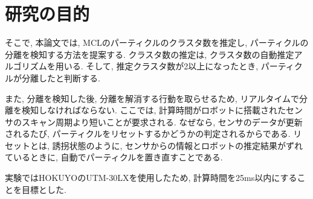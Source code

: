 \chapter{研究の目的}\label{chap:purpose}

そこで, 本論文では, MCLのパーティクルのクラスタ数を推定し, パーティクルの分離を検知する方法を提案する. 
クラスタ数の推定は, クラスタ数の自動推定アルゴリズムを用いる.
そして, 推定クラスタ数が2以上になったとき, パーティクルが分離したと判断する.

また, 分離を検知した後, 分離を解消する行動を取らせるため, リアルタイムで分離を検知しなければならない.
ここでは, 計算時間がロボットに搭載されたセンサのスキャン周期より短いことが要求される. 
なぜなら, センサのデータが更新されるたび, パーティクルをリセットするかどうかの判定されるからである.
リセットとは, 誘拐状態のように, センサからの情報とロボットの推定結果がずれているときに, 自動でパーティクルを置き直すことである.

実験ではHOKUYOのUTM-30LXを使用したため, 計算時間を25ms以内にすることを目標とした.
